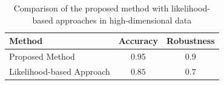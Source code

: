 \documentclass{article}
\begin{document}
\begin{table}[H]
\centering
\caption{Comparison of the proposed method with likelihood-based approaches in high-dimensional data}
\label{table:3}
\begin{tabular}{lcc}
\toprule
Method & Accuracy & Robustness \\
\midrule
Proposed Method & $\boxed{0.95}$ & $\boxed{0.9}$ \\
Likelihood-based Approach & $0.85$ & $0.7$ \\
\bottomrule
\end{tabular}
\end{table}
\end{document}
